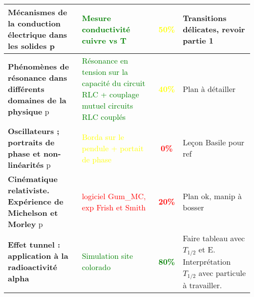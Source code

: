 \begin{changemargin}{-1.5cm}{-0cm}
\begin{center}
\begin{tabularx}{\paperwidth-2cm}{| X | X | c | X |}
  \hline
  \textbf{Mécanismes de la conduction électrique dans les solides} p\pageref{LP_Conduction} & \textcolor{green}{Mesure conductivité cuivre vs T} & \textcolor{yellow}{\textbf{50\%}} & Transitions délicates, revoir partie 1 \\
  \hline
  \textbf{Phénomènes de résonance dans différents domaines de la physique} p\pageref{LP_resonance} & \textcolor{green}{Résonance en tension sur la capacité du circuit RLC + couplage mutuel circuits RLC couplés} & \textcolor{yellow}{\textbf{40\%}} & Plan à détailler  \\
  \hline
  \textbf{Oscillateurs ; portraits de phase et non-linéarités} p\pageref{LP_PortaitPhase}~& \textcolor{yellow}{Borda sur le pendule + portait de phase} & \textcolor{red}{\textbf{0\%}} & Leçon Basile pour ref  \\
  \hline
  \hline
  \textbf{Cinématique relativiste. Expérience de Michelson et Morley} p\pageref{LP_CinematiqueRelativiste} & \textcolor{red}{logiciel Gum\_MC, exp Frish et Smith} & \textcolor{red}{\textbf{20\%}} & Plan ok, manip à bosser  \\
  \hline
  \textbf{Effet tunnel : application à la radioactivité alpha} & \textcolor{green}{Simulation site colorado}& \textcolor{green}{\textbf{80\%}} & Faire tableau avec $T_{1/2}$ et E. Interprétation $T_{1/2}$ avec particule à travailler. \\
  \hline
\end{tabularx}
\end{center}

\end{changemargin}